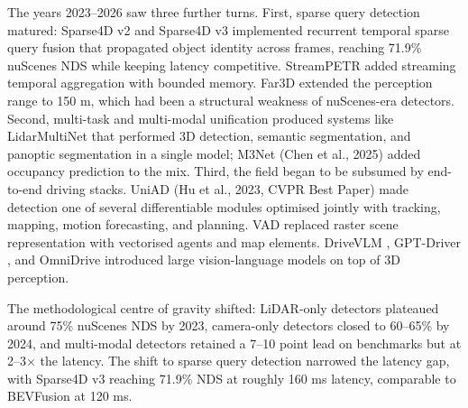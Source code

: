 \documentclass{article}
\begin{document}
The years 2023--2026 saw three further turns. First, sparse query detection matured: Sparse4D v2 \citep{lin2023sparse4dv2recurren} and Sparse4D v3 \citep{lin2023sparse4dv2recurren} implemented recurrent temporal sparse query fusion that propagated object identity across frames, reaching 71.9\% nuScenes NDS while keeping latency competitive. StreamPETR added streaming temporal aggregation with bounded memory. Far3D \citep{jiang2024far3dexpandingtheh} extended the perception range to 150 m, which had been a structural weakness of nuScenes-era detectors. Second, multi-task and multi-modal unification produced systems like LidarMultiNet \citep{ye2022lidarmultinetunify} that performed 3D detection, semantic segmentation, and panoptic segmentation in a single model; M3Net (Chen et al., 2025) added occupancy prediction to the mix. Third, the field began to be subsumed by end-to-end driving stacks. UniAD (Hu et al., 2023, CVPR Best Paper) made detection one of several differentiable modules optimised jointly with tracking, mapping, motion forecasting, and planning. VAD \citep{jiang2023polarformermultica} replaced raster scene representation with vectorised agents and map elements. DriveVLM \citep{tian2024drivevlmtheconverg}, GPT-Driver \citep{mao20233dobjectdetectionf}, and OmniDrive \citep{wang2024omnidriveaholistic} introduced large vision-language models on top of 3D perception.

The methodological centre of gravity shifted: LiDAR-only detectors plateaued around 75\% nuScenes NDS by 2023, camera-only detectors closed to 60--65\% by 2024, and multi-modal detectors retained a 7--10 point lead on benchmarks but at 2--3× the latency. The shift to sparse query detection narrowed the latency gap, with Sparse4D v3 reaching 71.9\% NDS at roughly 160 ms latency, comparable to BEVFusion at 120 ms.
\end{document}
